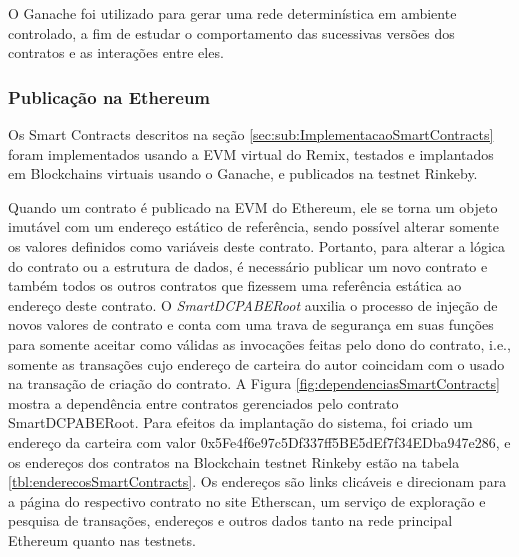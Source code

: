 \documentclass[a4paper,11pt]{article}
\begin{document}
O Ganache foi utilizado para gerar uma rede determinística em ambiente controlado, a fim de estudar o comportamento das sucessivas versões dos contratos e as interações entre eles. %

\subsubsection{Publicação na Ethereum}


Os Smart Contracts descritos na seção \ref{sec:sub:ImplementacaoSmartContracts} foram implementados usando a EVM virtual do Remix, testados e implantados em Blockchains virtuais usando o Ganache, e  publicados na testnet Rinkeby.

Quando um contrato é publicado na EVM do Ethereum, ele se torna um objeto imutável com um endereço  estático de referência, sendo possível alterar somente os valores definidos como variáveis deste contrato.
Portanto, para alterar a lógica do contrato ou a estrutura de dados, é necessário publicar um novo contrato e também todos os outros contratos que fizessem uma referência estática ao endereço deste contrato.
O \emph{SmartDCPABERoot} auxilia o processo de injeção de novos valores de contrato e conta com uma trava de segurança em suas funções para somente aceitar como válidas as invocações feitas pelo dono do contrato, i.e., somente as transações cujo  endereço de carteira do autor coincidam com o usado na transação de criação do contrato.
A Figura \ref{fig:dependenciasSmartContracts} mostra a dependência entre contratos gerenciados pelo contrato SmartDCPABERoot. %
Para efeitos da implantação do sistema, foi criado um endereço da carteira com valor 0x5Fe4f6e97c5Df337ff5BE5dEf7f34EDba947e286, e os endereços dos contratos na Blockchain testnet Rinkeby estão na tabela \ref{tbl:enderecosSmartContracts}. %
Os endereços são links clicáveis e direcionam para a página do respectivo contrato no site Etherscan, um serviço de exploração e pesquisa de transações, endereços e outros dados tanto na rede principal Ethereum quanto nas testnets.
\end{document}
